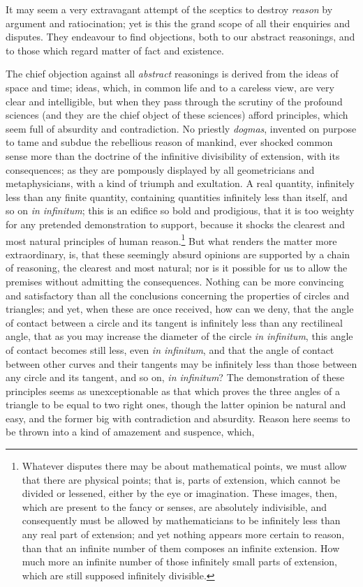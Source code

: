 \documentclass[]{article}
\newcounter{authornote}[page]
\newcommand*{\authornote}[1]{\renewcommand{\thefootnote}{\fnsymbol{footnote}}\stepcounter{authornote}\footnote[\value{authornote}]{#1}\renewcommand{\thefootnote}{\arabic{footnote}}}
\begin{document}
\begin{sectionbody}

\humeparagraph  It may seem a very extravagant attempt of the sceptics to destroy \emph{reason} by argument and ratiocination; yet is this the grand scope of all their enquiries and disputes. They endeavour to find objections, both to our abstract reasonings, and to those which regard matter of fact and existence.

\humeparagraph  The chief objection against all \emph{abstract} reasonings is derived from the ideas of space and time; ideas, which, in common life and to a careless view, are very clear and intelligible, but when they pass through the scrutiny of the profound sciences (and they are the chief object of these sciences) afford principles, which seem full of absurdity and contradiction. No priestly \emph{dogmas}, invented on purpose to tame and subdue the rebellious reason of mankind, ever shocked common sense more than the doctrine of the infinitive divisibility of extension, with its consequences; as they are pompously displayed by all geometricians and metaphysicians, with a kind of triumph and exultation. A real quantity, infinitely less than any finite quantity, containing quantities infinitely less than itself, and so on \emph{in infinitum}; this is an edifice so bold and prodigious, that it is too weighty for any pretended demonstration to support, because it shocks the clearest and most natural principles of human reason.\authornote{Whatever disputes there may be about mathematical points, we must allow that there are physical points; that is, parts of extension, which cannot be divided or lessened, either by the eye or imagination. These images, then, which are present to the fancy or senses, are absolutely indivisible, and consequently must be allowed by mathematicians to be infinitely less than any real part of extension; and yet nothing appears more certain to reason, than that an infinite number of them composes an infinite extension. How much more an infinite number of those infinitely small parts of extension, which are still supposed infinitely divisible.} But what renders the matter more extraordinary, is, that these seemingly absurd opinions are supported by a chain of reasoning, the clearest and most natural; nor is it possible for us to allow the premises without admitting the consequences. Nothing can be more convincing and satisfactory than all the conclusions concerning the properties of circles and triangles; and yet, when these are once received, how can we deny, that the angle of contact between a circle and its tangent is infinitely less than any rectilineal angle, that as you may increase the diameter of the circle \emph{in infinitum}, this angle of contact becomes still less, even \emph{in infinitum}, and that the angle of contact between other curves and their tangents may be infinitely less than those between any circle and its tangent, and so on, \emph{in infinitum}? The demonstration of these principles seems as unexceptionable as that which proves the three angles of a triangle to be equal to two right ones, though the latter opinion be natural and easy, and the former big with contradiction and absurdity. Reason here seems to be thrown into a kind of amazement and suspence, which, 
\end{sectionbody}
\end{document}
